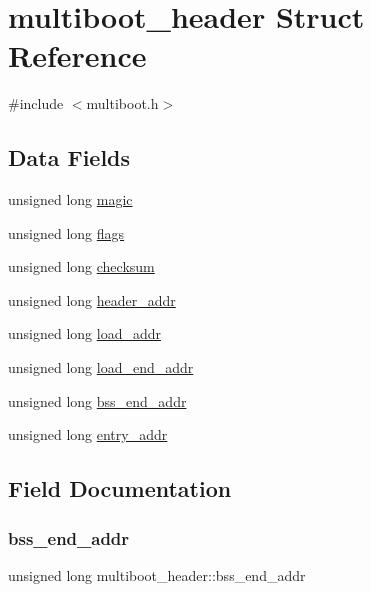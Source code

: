 \hypertarget{structmultiboot__header}{}\section{multiboot\+\_\+header Struct Reference}
\label{structmultiboot__header}


{\ttfamily \#include $<$multiboot.\+h$>$}

\subsection*{Data Fields}
\begin{DoxyCompactItemize}
\item 
unsigned long \hyperlink{structmultiboot__header_ad685c9fda952c9ce602f530e5270eb6b}{magic}
\item 
unsigned long \hyperlink{structmultiboot__header_a323f1b9b81159e684a851402f0c75381}{flags}
\item 
unsigned long \hyperlink{structmultiboot__header_ae820d9c140123e01b6f8a3a39c69851f}{checksum}
\item 
unsigned long \hyperlink{structmultiboot__header_a8a3d459775596f92e50b36bc2018ea7a}{header\+\_\+addr}
\item 
unsigned long \hyperlink{structmultiboot__header_a5ccde6f22ea2a602f0e9e5c08740f831}{load\+\_\+addr}
\item 
unsigned long \hyperlink{structmultiboot__header_abf9d70f5dace001e3460dcf779ef6876}{load\+\_\+end\+\_\+addr}
\item 
unsigned long \hyperlink{structmultiboot__header_a53eb04681217e6c771486b8adb4c8265}{bss\+\_\+end\+\_\+addr}
\item 
unsigned long \hyperlink{structmultiboot__header_a3581a47c4ab86b54fb9f051ed1ed4bb0}{entry\+\_\+addr}
\end{DoxyCompactItemize}


\subsection{Field Documentation}
\mbox{\label{structmultiboot__header_a53eb04681217e6c771486b8adb4c8265}} 
\subsubsection{\texorpdfstring{bss\+\_\+end\+\_\+addr}{bss\_end\_addr}}
{\footnotesize\ttfamily unsigned long multiboot\+\_\+header\+::bss\+\_\+end\+\_\+addr}

